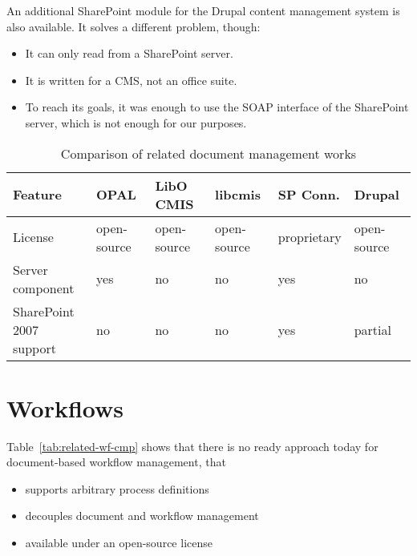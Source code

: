 An additional SharePoint module \cite{drupal-sp} for the Drupal content management system is also available. It solves a different problem, though:

\begin{itemize}
\item It can only read from a SharePoint server.
\item It is written for a CMS, not an office suite.
\item To reach its goals, it was enough to use the SOAP interface of the
SharePoint server, which is not enough for our purposes.
\end{itemize}

\begin{table}[H]
  \begin{center}
    \begin{tabular}{| l | l | l | l | l | l |}
    \hline
    \textbf{Feature} & \textbf{OPAL} & \textbf{LibO CMIS} & \textbf{libcmis} & \textbf{SP Conn.} & \textbf{Drupal} \\ \hline
    License          & open-source   & open-source        & open-source      & proprietary                   & open-source \\ \hline
    Server component & yes           & no                 & no               & yes                           & no \\ \hline
    \makecell[l]{SharePoint 2007 \\ support} & no & no    & no               & yes                           & partial \\ \hline
    \end{tabular}
  \end{center}
  \caption{Comparison of related document management works}
  \label{tab:related-cmp}
\end{table}

\section{Workflows}

Table~\ref{tab:related-wf-cmp} shows that there is no ready approach today for
document-based workflow management, that

\begin{itemize}
\item supports arbitrary process definitions
\item decouples document and workflow management
\item available under an open-source license
\end{itemize}

